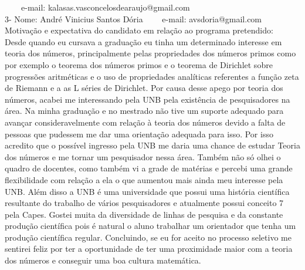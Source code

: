 \documentclass[11pt]{article}
\begin{document}
\ \ \ \ e-mail: kalasas.vasconcelosdearaujo@gmail.com
\\
3- Nome: André Vinicius Santos Dória
\ \ \ \ e-mail: avsdoria@gmail.com
\\[0.2cm]
Motivação e expectativa do candidato em relação ao programa pretendido:
\\Desde quando eu cursava a graduação eu tinha um determinado interesse em teoria dos números, principalmente pelas propriedades dos números primos como por exemplo o teorema dos números primos e o teorema de Dirichlet sobre progressões aritméticas e o uso de propriedades analíticas referentes a função zeta de Riemann 
e a as L séries de Dirichlet. Por causa desse apego por teoria dos números, acabei me interessando pela UNB pela existência de pesquisadores na área. Na minha graduação e no mestrado não tive um suporte adequado para avançar consideravelmente
com relação à teoria dos números devido a falta de pessoas que pudessem me dar uma orientação adequada para isso. Por isso acredito que o possível ingresso pela UNB me daria uma chance de estudar Teoria dos números e me tornar um pesquisador nessa área. Também não só olhei o quadro de docentes, como também vi a grade de matérias e percebi uma grande flexibilidade com relação a ela o que aumentou mais ainda meu interesse pela UNB. Além disso a UNB é uma universidade que possui uma história científica resultante do trabalho de vários pesquisadores e atualmente possui conceito 7 pela Capes. Gostei muita da diversidade de linhas de pesquisa e da constante produção científica pois é natural o aluno trabalhar um orientador que tenha um produção científica regular. Concluindo, se eu for aceito no processo seletivo me sentirei feliz por ter a oportunidade  de ter uma proximidade maior com a teoria dos números e conseguir uma boa cultura matemática.
  
\end{document}

